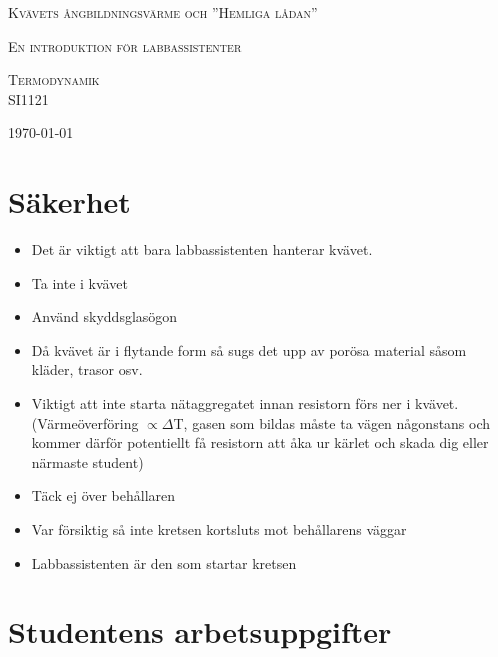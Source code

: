 \documentclass[11pt]{article}
\begin{document}
\begin{titlepage}
	\centering
	{\scshape\LARGE Kvävets ångbildningsvärme och ”Hemliga lådan” \par}
	{\scshape En introduktion för labbassistenter \par}
	\vspace{4cm}
	{\scshape\Large Termodynamik \\ SI1121\par}
	\vspace{2cm}
	\vfill
	{\large \today\par}
\end{titlepage}

\section{Säkerhet}
 
\begin{itemize}
    \item Det är viktigt att bara labbassistenten hanterar kvävet.
    \item Ta inte i kvävet
    \item Använd skyddsglasögon
    \item Då kvävet är i flytande form så sugs det upp av porösa material såsom kläder, trasor osv.
    \item Viktigt att inte starta nätaggregatet innan resistorn förs ner i kvävet. (Värmeöverföring $\propto \Delta $T, gasen som bildas måste ta vägen någonstans och kommer därför potentiellt få resistorn att åka ur kärlet och skada dig eller närmaste student)
    \item Täck ej över behållaren
    \item Var försiktig så inte kretsen kortsluts mot behållarens väggar
    \item Labbassistenten är den som startar kretsen
\end{itemize}

\section{Studentens arbetsuppgifter}
\end{document}
